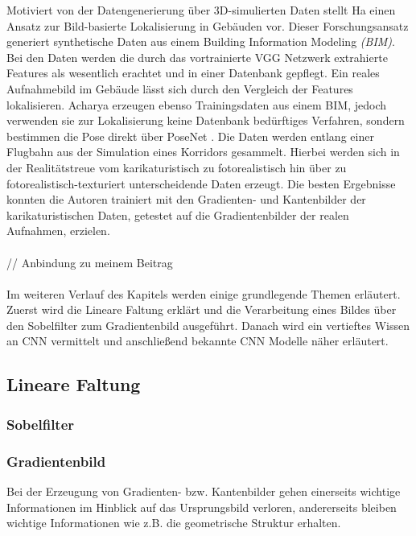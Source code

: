 Motiviert von der Datengenerierung über 3D-simulierten Daten stellt Ha \etal\cite{haImagebasedIndoorLocalization2018} einen Ansatz zur Bild-basierte Lokalisierung in Gebäuden vor. Dieser Forschungsansatz generiert synthetische Daten aus einem Building Information Modeling \textit{(BIM)}. Bei den Daten werden die durch das vortrainierte VGG Netzwerk \cite{simonyanVeryDeepConvolutional2014} extrahierte Features als wesentlich erachtet und in einer Datenbank gepflegt. Ein reales Aufnahmebild im Gebäude lässt sich durch den Vergleich der Features lokalisieren. Acharya \etal\cite{acharyaBIMPoseNetIndoorCamera2019, acharyaMODELLINGUNCERTAINTYSINGLE2019} erzeugen ebenso Trainingsdaten aus einem BIM, jedoch verwenden sie zur Lokalisierung keine Datenbank bedürftiges Verfahren, sondern bestimmen die Pose direkt über PoseNet \cite{kendallPoseNetConvolutionalNetwork2015}. Die Daten werden entlang einer Flugbahn aus der Simulation eines Korridors gesammelt. Hierbei werden sich in der Realitätstreue vom karikaturistisch zu fotorealistisch hin über zu fotorealistisch-texturiert unterscheidende Daten erzeugt. Die besten Ergebnisse konnten die Autoren trainiert mit den Gradienten- und Kantenbilder der karikaturistischen Daten, getestet auf die Gradientenbilder der realen Aufnahmen, erzielen.
\\\\// Anbindung zu meinem Beitrag
\\\\
Im weiteren Verlauf des Kapitels werden einige grundlegende Themen erläutert. Zuerst wird die Lineare Faltung erklärt und die Verarbeitung eines Bildes über den Sobelfilter zum Gradientenbild ausgeführt. Danach wird ein vertieftes Wissen an CNN vermittelt und anschließend bekannte CNN Modelle näher erläutert.

\subsection{Lineare Faltung}
\subsubsection{Sobelfilter}
\subsubsection{Gradientenbild}
Bei der Erzeugung von Gradienten- bzw. Kantenbilder gehen einerseits wichtige Informationen im Hinblick auf das Ursprungsbild verloren, andererseits bleiben wichtige Informationen wie z.B. die geometrische Struktur erhalten.
